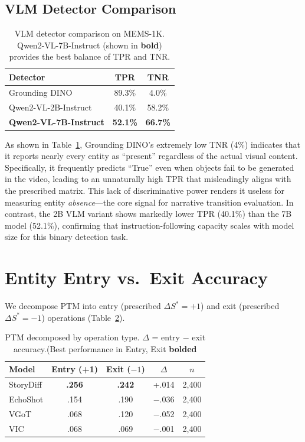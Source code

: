 \documentclass[sigconf,review,anonymous]{acmart}
\begin{document}
\subsection{VLM Detector Comparison}
\begin{table}[H]
\caption{VLM detector comparison on MEMS-1K. Qwen2-VL-7B-Instruct (shown in \textbf{bold}) provides the best balance of TPR and TNR.}
\label{tab:vlm_comparison}
\centering
\small
\begin{tabular}{@{}lcc@{}}
\toprule
Detector & TPR & TNR \\
\midrule
Grounding DINO~\cite{groundingdino} & 89.3\% & 4.0\% \\
Qwen2-VL-2B-Instruct & 40.1\% & 58.2\% \\
\textbf{Qwen2-VL-7B-Instruct} & \textbf{52.1\%} & \textbf{66.7\%} \\
\bottomrule
\end{tabular}
\end{table}

\noindent As shown in Table~\ref{tab:vlm_comparison}, Grounding DINO's extremely low TNR (4\%) indicates that it reports nearly every entity as ``present'' regardless of the actual visual content. Specifically, it frequently predicts ``True'' even when objects fail to be generated in the video, leading to an unnaturally high TPR that misleadingly aligns with the prescribed matrix. This lack of discriminative power renders it useless for measuring entity \emph{absence}---the core signal for narrative transition evaluation. In contrast, the 2B VLM variant shows markedly lower TPR (40.1\%) than the 7B model (52.1\%), confirming that instruction-following capacity scales with model size for this binary detection task.


\section{Entity Entry vs.\ Exit Accuracy}
\label{app:entry_exit}

We decompose PTM into entry (prescribed $\Delta S^* = +1$) and exit (prescribed $\Delta S^* = -1$) operations (Table~\ref{tab:entry_exit}).
\begin{table}[H]
\caption{PTM decomposed by operation type. $\Delta$ = entry $-$ exit accuracy.(Best performance in Entry, Exit \textbf{bolded}}
\label{tab:entry_exit}
\centering
\small
\begin{tabular}{@{}lcccc@{}}
\toprule
Model & Entry (+1) & Exit ($-1$) & $\Delta$ & $n$ \\
\midrule
StoryDiff    & \textbf{.256} & \textbf{.242} & +.014 & 2,400 \\
EchoShot  & .154 & .190 & $-$.036 & 2,400 \\
VGoT  & .068 & .120 & $-$.052 & 2,400 \\
VIC   & .068 & .069 & $-$.001 & 2,400 \\
\bottomrule
\end{tabular}
\end{table}
\end{document}
